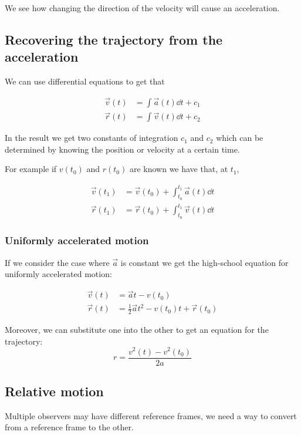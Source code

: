 \documentclass[14pt]{extarticle}
\begin{document}
We see how changing the direction of the velocity will cause an acceleration.

\subsection{Recovering the trajectory from the acceleration}

We can use differential equations to get that

\begin{align*}
  \vec{v}(t) & = \int \vec{a}(t) \dd{t} + c_1 \\
  \vec{r}(t) & = \int \vec{v}(t) \dd{t} + c_2
\end{align*}

In the result we get two constants of integration $c_1$ and $c_2$
which can be determined by knowing the position or velocity at a certain time.

For example if $v(t_0)$ and $r(t_0)$ are known we have that, at $t_1$,

\begin{align*}
  \vec{v}(t_1) & = \vec{v}(t_0) + \int_{t_0}^{t_1} \vec{a}(t) \dd{t} \\
  \vec{r}(t_1) & = \vec{r}(t_0) + \int_{t_0}^{t_1} \vec{v}(t) \dd{t}
\end{align*}

\subsubsection{Uniformly accelerated motion}

If we consider the case where $\vec{a}$ is constant we get
the high-school equation for uniformly accelerated motion:

\begin{align*}
  \vec{v}(t) & = \vec{a} t - v(t_0)                                \\
  \vec{r}(t) & = \frac{1}{2} \vec{a} t^2 - v(t_0) t + \vec{r}(t_0)
\end{align*}

Moreover, we can substitute one into the other to get an equation for the trajectory:
$$
  r = \frac{v^2(t) - v^2(t_0)}{2a}
$$

\subsection{Relative motion}

Multiple observers may have different reference frames,
we need a way to convert from a reference frame to the other.
\end{document}
